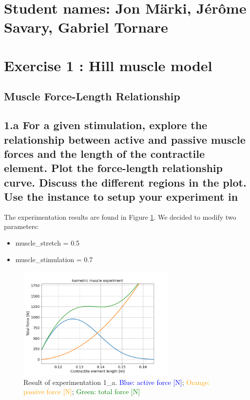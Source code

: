 \documentclass{cmc}
\begin{document}
\pagestyle{fancy}
 

\section*{Student names: Jon Märki, Jérôme Savary, Gabriel Tornare}

\section*{Exercise 1 : Hill muscle model}
\label{sec:question-2}

\subsection*{Muscle Force-Length Relationship}
\label{sec:muscle-force-length}

\subsection*{1.a For a given stimulation, explore the relationship
  between active and passive muscle forces and the length of the
  contractile element.  Plot the force-length relationship curve.
  Discuss the different regions in the plot. Use the
   instance
  to setup your experiment in }

    
    The experimentation results are found in Figure \ref{fig:ex_1a}. We decided to modify two parameters:
    \begin{itemize}
        \item muscle\_stretch = 0.5
        \item muscle\_stimulation = 0.7
    \end{itemize}
    
    \begin{figure}[H]
      \centering \includegraphics[width=0.7\textwidth]{figures/1a.png}
      \caption{\label{fig:ex_1a} Result of experimentation 1\_a. \textcolor{blue}{Blue: active force [N]}; \textcolor{orange}{Orange: passive force [N]}; \textcolor{green}{Green: total force [N]}}
    \end{figure}
    
\end{document}
